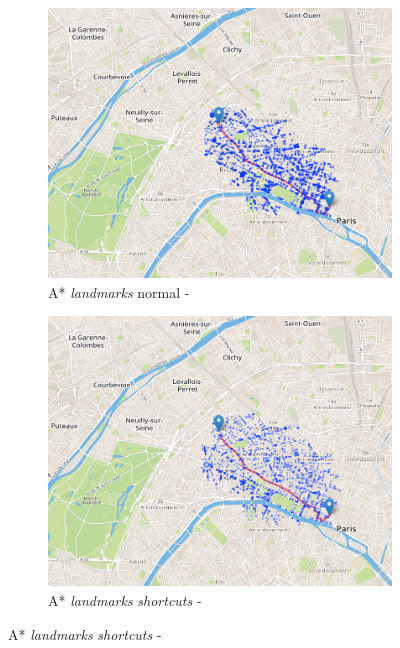 \documentclass[a4paper, 11pt, DIV=12, numbers=enddot]{scrartcl}
\begin{document}
\begin{figure}[!h]
\begin{subfigure}[b]{.49\textwidth}
    \includegraphics[width=\textwidth]{fig/landmarks.png}
    \caption{A* \emph{landmarks} normal - }
  \end{subfigure}
  \hfill
  \begin{subfigure}[b]{.49\textwidth}
    \includegraphics[width=\textwidth]{fig/landmarks_hl.png}
    \caption{A* \emph{landmarks} \emph{shortcuts} - }
  \end{subfigure}
\end{figure}
\end{document}
